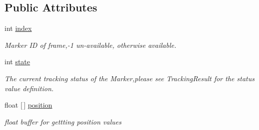\subsection*{Public Attributes}
\begin{DoxyCompactItemize}
\item 
\mbox{\label{struct_ximmerse_1_1_input_system_1_1_x_device_plugin_1_1_act_param___marker_info_a271fbd18e2955e7d97949f4756279960}} 
int \mbox{\hyperlink{struct_ximmerse_1_1_input_system_1_1_x_device_plugin_1_1_act_param___marker_info_a271fbd18e2955e7d97949f4756279960}{index}}
\begin{DoxyCompactList}\small\item\em Marker ID of frame,-\/1 un-\/available, otherwise available. \end{DoxyCompactList}\item 
\mbox{\label{struct_ximmerse_1_1_input_system_1_1_x_device_plugin_1_1_act_param___marker_info_abd9ea7aeb8332afce605e24a30048c18}} 
int \mbox{\hyperlink{struct_ximmerse_1_1_input_system_1_1_x_device_plugin_1_1_act_param___marker_info_abd9ea7aeb8332afce605e24a30048c18}{state}}
\begin{DoxyCompactList}\small\item\em The current tracking status of the Marker,please see Tracking\+Result for the status value definition. \end{DoxyCompactList}\item 
\mbox{\label{struct_ximmerse_1_1_input_system_1_1_x_device_plugin_1_1_act_param___marker_info_a57c0d5629a4f4b21e6ddf5e645acde92}} 
float \mbox{[}$\,$\mbox{]} \mbox{\hyperlink{struct_ximmerse_1_1_input_system_1_1_x_device_plugin_1_1_act_param___marker_info_a57c0d5629a4f4b21e6ddf5e645acde92}{position}}
\begin{DoxyCompactList}\small\item\em float buffer for gettting position values \end{DoxyCompactList}\item 
\mbox{\label{struct_ximmerse_1_1_input_system_1_1_x_device_plugin_1_1_act_param___marker_info_a25b6e2286a0dc69f8b8d89bac3c18daa}} 

\end{DoxyCompactItemize}
